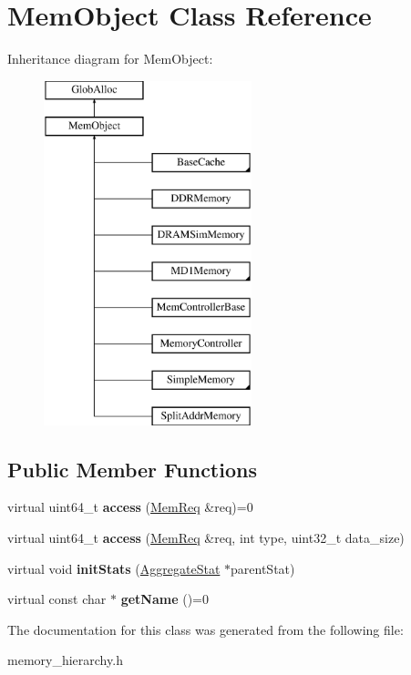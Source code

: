 \hypertarget{classMemObject}{\section{Mem\-Object Class Reference}
\label{classMemObject}
}
Inheritance diagram for Mem\-Object\-:\begin{figure}[H]
\begin{center}
\leavevmode
\includegraphics[height=10.000000cm]{classMemObject}
\end{center}
\end{figure}
\subsection*{Public Member Functions}
\begin{DoxyCompactItemize}
\item 
\hypertarget{classMemObject_aca4da1625a88f6bf6c3ec41c20a4a956}{virtual uint64\-\_\-t {\bfseries access} (\hyperlink{structMemReq}{Mem\-Req} \&req)=0}\label{classMemObject_aca4da1625a88f6bf6c3ec41c20a4a956}

\item 
\hypertarget{classMemObject_aec4768ffc88ca0ef305969c3d85c8737}{virtual uint64\-\_\-t {\bfseries access} (\hyperlink{structMemReq}{Mem\-Req} \&req, int type, uint32\-\_\-t data\-\_\-size)}\label{classMemObject_aec4768ffc88ca0ef305969c3d85c8737}

\item 
\hypertarget{classMemObject_a791d5b0060cfc96f2109949e2da87f12}{virtual void {\bfseries init\-Stats} (\hyperlink{classAggregateStat}{Aggregate\-Stat} $\ast$parent\-Stat)}\label{classMemObject_a791d5b0060cfc96f2109949e2da87f12}

\item 
\hypertarget{classMemObject_a56c0fb3a2f420c9c74b5dd3dc5b194b5}{virtual const char $\ast$ {\bfseries get\-Name} ()=0}\label{classMemObject_a56c0fb3a2f420c9c74b5dd3dc5b194b5}

\end{DoxyCompactItemize}


The documentation for this class was generated from the following file\-:\begin{DoxyCompactItemize}
\item 
memory\-\_\-hierarchy.\-h\end{DoxyCompactItemize}

